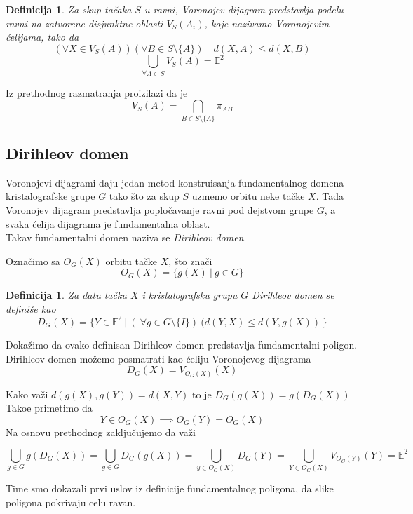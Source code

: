 \documentclass[11pt]{article}
\newtheorem{definition}[theorem]{\bf Definicija}
\begin{document}
\begin{definition}%
Za skup ta\v caka $S$ u ravni, Voronojev dijagram predstavlja podelu ravni na zatvorene disjunktne oblasti $V_S(A_i)$, koje nazivamo Voronojevim \' celijama, tako da
$$ (\forall X \in V_{S}(A))(\forall B \in S\setminus \{A\})\quad d(X,A)\leq d(X,B) $$
$$ \bigcup_{\forall A \in S} V_{S}(A) = \mathbb{E}^2 $$

\end{definition}

Iz prethodnog razmatranja proizilazi da je
$$V_S(A) = \bigcap _{B \in S \setminus \{A\}} \pi_{AB}$$

\subsection{Dirihleov domen}

Voronojevi dijagrami daju jedan metod konstruisanja fundamentalnog domena kristalografske grupe $G$ tako \v sto za skup $S$ uzmemo orbitu neke ta\v cke $X$. Tada Voronojev dijagram predstavlja poplo\v cavanje ravni pod dejstvom grupe $G$, a svaka \' celija dijagrama je fundamentalna oblast. \\
Takav fundamentalni domen naziva se \emph{Dirihleov domen}.

Ozna\v cimo sa $O_G(X)$ orbitu ta\v cke $X$,  \v sto zna\v ci 
$$O_G(X) = \{g(X)\:|\:g \in G\} $$

\begin{definition}
Za datu ta\v cku $X$ i kristalografsku grupu $G$ Dirihleov domen se defini\v se kao  
$$D_G(X) = \{Y \in \mathbb{E}^2\:|\:(\:\forall g \in G \setminus \{I\})\:(d(Y,X)\leq d(Y,g(X))\:\}$$
\end{definition}

\noindent Doka\v zimo da ovako definisan Dirihleov domen predstavlja fundamentalni poligon.
Dirihleov domen mo\v zemo posmatrati kao \' celiju Voronojevog dijagrama 
$$D_G(X)= V_{O_G(X)}(X)$$

\noindent Kako va\v zi $d(g(X), g(Y))= d(X,Y)$ to je $D_G(g(X)) = g(D_G(X))$  
Tako\dj e primetimo da $$Y \in  O_G(X) \implies O_G(Y) = O_G(X) $$
Na osnovu prethodnog zaklju\v cujemo da va\v zi

$$\bigcup_{g\in G}g(D_G(X)) = \bigcup_{g\in G}D_G(g(X)) = \bigcup_{y \in O_G(X)}D_G(Y)
= \bigcup_{Y \in O_G(X)}V_{O_G(Y)}(Y) = \mathbb{E}^2$$

\noindent Time smo dokazali prvi uslov iz definicije fundamentalnog poligona, da slike poligona pokrivaju celu ravan.
\end{document}

